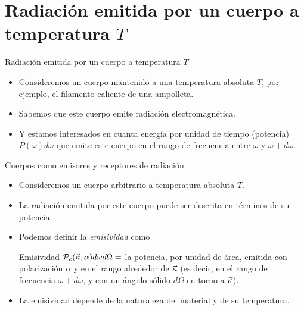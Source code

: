 \documentclass{sintefbeamer}
\begin{document}
\section{Radiación emitida por un cuerpo a temperatura $T$}
\begin{frame}{Radiación emitida por un cuerpo a temperatura $T$}
    \begin{itemize}
        \item Consideremos un cuerpo mantenido a una temperatura absoluta $T$, por ejemplo, el filamento caliente de una ampolleta.\pause
        \item Sabemos que este cuerpo emite radiación electromagnética.\pause
        \item Y estamos interesados en cuanta energía por unidad de tiempo (potencia) $P(\omega)d\omega$ que emite este cuerpo en el rango de frecuencia  entre $\omega$ y $\omega+d\omega$.
    \end{itemize}
\end{frame}

\begin{frame}{Cuerpos como emisores y receptores de radiación}
    \begin{itemize}
        \item Consideremos un cuerpo arbitrario a temperatura absoluta $T$.\pause
        \item La radiación emitida por este cuerpo puede ser descrita en términos de su potencia.\pause
        \item Podemos definir la \emph{emisividad} como\pause
        \begin{block}{Emisividad}
            $\mathcal{P}_e(\Vec{\kappa},\alpha)d\omega d\Omega = $ la potencia, por unidad de área, emitida con polarización $\alpha$ y en el rango alrededor de $\Vec{\kappa}$ (es decir, en el rango de frecuencia $\omega + d\omega$, y con un ángulo sólido $d\Omega$ en torno a $\Vec{\kappa}$).
        \end{block}\pause
        \item La emisividad depende de la naturaleza del material y de su temperatura.
    \end{itemize}
\end{frame}
\end{document}
